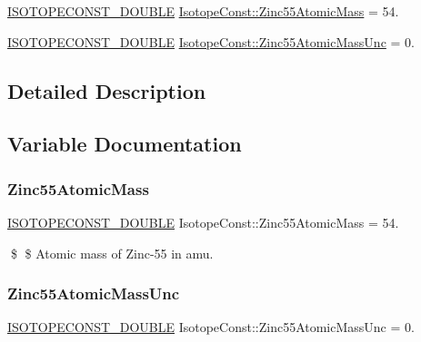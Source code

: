 \begin{DoxyCompactItemize}
\item 
\mbox{\hyperlink{group___isotope_const-_macros_ga8f45a7272ce02c0b4c65c44636ed719a}{I\+S\+O\+T\+O\+P\+E\+C\+O\+N\+S\+T\+\_\+\+D\+O\+U\+B\+LE}} \mbox{\hyperlink{group___isotope_const-_zinc-_zn55_ga4d5c74495429dfcfbf6b31218d4ac6ba}{Isotope\+Const\+::\+Zinc55\+Atomic\+Mass}} = 54.
\item 
\mbox{\hyperlink{group___isotope_const-_macros_ga8f45a7272ce02c0b4c65c44636ed719a}{I\+S\+O\+T\+O\+P\+E\+C\+O\+N\+S\+T\+\_\+\+D\+O\+U\+B\+LE}} \mbox{\hyperlink{group___isotope_const-_zinc-_zn55_gaf30f477f697a61a53e7bdddb511429f6}{Isotope\+Const\+::\+Zinc55\+Atomic\+Mass\+Unc}} = 0.
\end{DoxyCompactItemize}


\subsection{Detailed Description}


\subsection{Variable Documentation}
\mbox{\label{group___isotope_const-_zinc-_zn55_ga4d5c74495429dfcfbf6b31218d4ac6ba}} 
\subsubsection{\texorpdfstring{Zinc55\+Atomic\+Mass}{Zinc55AtomicMass}}
{\footnotesize\ttfamily \mbox{\hyperlink{group___isotope_const-_macros_ga8f45a7272ce02c0b4c65c44636ed719a}{I\+S\+O\+T\+O\+P\+E\+C\+O\+N\+S\+T\+\_\+\+D\+O\+U\+B\+LE}} Isotope\+Const\+::\+Zinc55\+Atomic\+Mass = 54.}

\$ \$ Atomic mass of Zinc-\/55 in amu. \mbox{\label{group___isotope_const-_zinc-_zn55_gaf30f477f697a61a53e7bdddb511429f6}} 
\subsubsection{\texorpdfstring{Zinc55\+Atomic\+Mass\+Unc}{Zinc55AtomicMassUnc}}
{\footnotesize\ttfamily \mbox{\hyperlink{group___isotope_const-_macros_ga8f45a7272ce02c0b4c65c44636ed719a}{I\+S\+O\+T\+O\+P\+E\+C\+O\+N\+S\+T\+\_\+\+D\+O\+U\+B\+LE}} Isotope\+Const\+::\+Zinc55\+Atomic\+Mass\+Unc = 0.}


